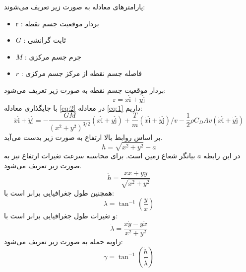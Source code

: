 پارامترهای معادله به صورت زیر تعریف می‌شوند:
\begin{itemize}
    \item $\boldsymbol{\mathrm{r}}$ : بردار موقعیت جسم نقطه
    \item $G$ : ثابت گرانشی
    \item $M$ : جرم جسم مرکزی
    \item $r$ : فاصله جسم نقطه از مرکز جسم مرکزی
\end{itemize}
بردار موقعیت جسم نقطه به صورت زیر تعریف می‌شود:
\begin{equation}
    \label{eq:2}
    \boldsymbol{\mathrm{r}} = x\hat{\boldsymbol{\mathrm{i}}} + y\hat{\boldsymbol{\mathrm{j}}}
\end{equation}
با جایگذاری معادله \eqref{eq:2} در معادله \eqref{eq:1} داریم:
\begin{equation}
    \label{eq:3}
    \ddot{x}\hat{\boldsymbol{\mathrm{i}}} + \ddot{y}\hat{\boldsymbol{\mathrm{j}}} = -\dfrac{GM}{(x^2 + y^2)^{3/2}}(x\hat{\boldsymbol{\mathrm{i}}} + y\hat{\boldsymbol{\mathrm{j}}}) + \dfrac{T}{m} (\dot x\hat{\boldsymbol{\mathrm{i}}} + \dot y\hat{\boldsymbol{\mathrm{j}}}) / v -\dfrac{1}{2}\rho C_D A v (\dot x\hat{\boldsymbol{\mathrm{i}}} + \dot y\hat{\boldsymbol{\mathrm{j}}})
\end{equation}
بر اساس روابط بالا ارتفاع به صورت زیر بدست می‌آید.
\begin{equation}
    \label{eq:4}
    h =\sqrt{x^2 + y^2} - a
\end{equation}
در این رابطه $a$ بیانگر شعاع زمین است. برای محاسبه سرعت 
تغیرات ارتفاع نیز به صورت زیر تعریف می‌شود.
\begin{equation}
    \label{eq:5}
    \dot{h} = \dfrac{x\dot{x} + y\dot{y}}{\sqrt{x^2 + y^2}}
\end{equation}
همچنین طول جغرافیایی برابر است با:
\begin{equation}
    \label{eq:6}
    \lambda = \tan^{-1}\left(\dfrac{y}{x}\right)
\end{equation}
و تغیرات طول جغرافیایی برابر است با:
\begin{equation}
    \label{eq:7}
    \dot{\lambda} = \dfrac{x\dot{y} - y\dot{x}}{x^2 + y^2}
\end{equation}
زاویه حمله به صورت زیر تعریف می‌شود:
\begin{equation}
    \label{eq:8}
    \gamma = \tan^{-1}\left(\dfrac{\dot{h}}{\dot{\lambda}}\right)
\end{equation}

